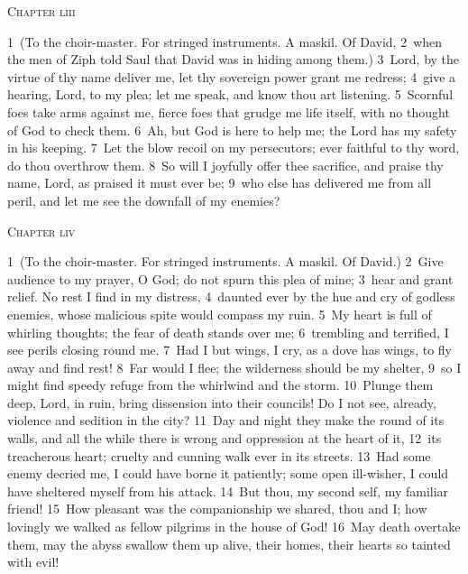 \documentclass[10pt]{book} %
\begin{document}
\begin{large}\begin{center}\textsc{Chapter liii}\end{center}\end{large}
\textcolor{benred8}{1}~(To the choir-master. For stringed instruments. A maskil. Of David, \textcolor{benred8}{2}~when the men of Ziph told Saul that David was in hiding among them.)
\textcolor{benred8}{3}~Lord, by the virtue of thy name deliver me, let thy sovereign power grant me redress; \textcolor{benred8}{4}~give a hearing, Lord, to my plea; let me speak, and know thou art listening. \textcolor{benred8}{5}~Scornful foes take arms against me, fierce foes that grudge me life itself, with no thought of God to check them. \textcolor{benred8}{6}~Ah, but God is here to help me; the Lord has my safety in his keeping. \textcolor{benred8}{7}~Let the blow recoil on my persecutors; ever faithful to thy word, do thou overthrow them. \textcolor{benred8}{8}~So will I joyfully offer thee sacrifice, and praise thy name, Lord, as praised it must ever be; \textcolor{benred8}{9}~who else has delivered me from all peril, and let me see the downfall of my enemies?
\begin{large}\begin{center}\textsc{Chapter liv}\end{center}\end{large}
\textcolor{benred8}{1}~(To the choir-master. For stringed instruments. A maskil. Of David.)
\textcolor{benred8}{2}~Give audience to my prayer, O God; do not spurn this plea of mine; \textcolor{benred8}{3}~hear and grant relief. No rest I find in my distress, \textcolor{benred8}{4}~daunted ever by the hue and cry of godless enemies, whose malicious spite would compass my ruin. \textcolor{benred8}{5}~My heart is full of whirling thoughts; the fear of death stands over me; \textcolor{benred8}{6}~trembling and terrified, I see perils closing round me. \textcolor{benred8}{7}~Had I but wings, I cry, as a dove has wings, to fly away and find rest! \textcolor{benred8}{8}~Far would I flee; the wilderness should be my shelter, \textcolor{benred8}{9}~so I might find speedy refuge from the whirlwind and the storm.
\textcolor{benred8}{10}~Plunge them deep, Lord, in ruin, bring dissension into their councils! Do I not see, already, violence and sedition in the city? \textcolor{benred8}{11}~Day and night they make the round of its walls, and all the while there is wrong and oppression at the heart of it, \textcolor{benred8}{12}~its treacherous heart; cruelty and cunning walk ever in its streets. \textcolor{benred8}{13}~Had some enemy decried me, I could have borne it patiently; some open ill-wisher, I could have sheltered myself from his attack. \textcolor{benred8}{14}~But thou, my second self, my familiar friend! \textcolor{benred8}{15}~How pleasant was the companionship we shared, thou and I; how lovingly we walked as fellow pilgrims in the house of God! \textcolor{benred8}{16}~May death overtake them, may the abyss swallow them up alive, their homes, their hearts so tainted with evil!
\end{document}
